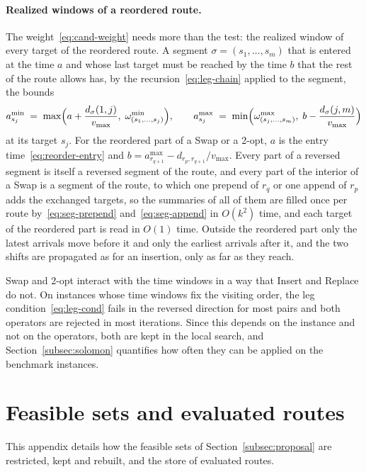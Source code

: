 \documentclass[11pt]{article}
\begin{document}
\paragraph{Realized windows of a reordered route.}
The weight~\eqref{eq:cand-weight} needs more than the test: the realized window of every target of the reordered route. A segment $\sigma = (s_1, \ldots, s_m)$ that is entered at the time $a$ and whose last target must be reached by the time $b$ that the rest of the route allows has, by the recursion~\eqref{eq:leg-chain} applied to the segment, the bounds
\begin{equation}\label{eq:seg-window}
    a^{\min}_{s_j} \;=\; \max\Bigl( a + \frac{d_\sigma(1, j)}{v_{\max}},\; \omega^{\min}_{(s_1, \ldots, s_j)} \Bigr),
    \qquad
    a^{\max}_{s_j} \;=\; \min\Bigl( \omega^{\max}_{(s_j, \ldots, s_m)},\; b - \frac{d_\sigma(j, m)}{v_{\max}} \Bigr)
\end{equation}
at its target $s_j$. For the reordered part of a Swap or a 2-opt, $a$ is the entry time~\eqref{eq:reorder-entry} and $b = a^{\max}_{r_{q+1}} - d_{r_p, r_{q+1}} / v_{\max}$. Every part of a reversed segment is itself a reversed segment of the route, and every part of the interior of a Swap is a segment of the route, to which one prepend of $r_q$ or one append of $r_p$ adds the exchanged targets, so the summaries of all of them are filled once per route by~\eqref{eq:seg-prepend} and~\eqref{eq:seg-append} in $O(k^2)$ time, and each target of the reordered part is read in $O(1)$ time. Outside the reordered part only the latest arrivals move before it and only the earliest arrivals after it, and the two shifts are propagated as for an insertion, only as far as they reach.

Swap and 2-opt interact with the time windows in a way that Insert and Replace do not. On instances whose time windows fix the visiting order, the leg condition~\eqref{eq:leg-cond} fails in the reversed direction for most pairs and both operators are rejected in most iterations. Since this depends on the instance and not on the operators, both are kept in the local search, and Section~\ref{subsec:solomon} quantifies how often they can be applied on the benchmark instances.

\section{Feasible sets and evaluated routes}\label{app:sets}

This appendix details how the feasible sets of Section~\ref{subsec:proposal} are restricted, kept and rebuilt, and the store of evaluated routes.
\end{document}
